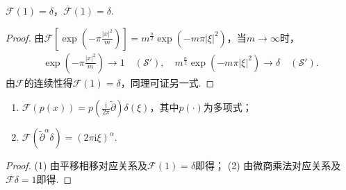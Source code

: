 \documentclass[../../main.tex]{subfiles}%
\begin{document}
\begin{proposition}
$\mathscr{F}(1)=\delta$，$\overline{\mathscr{F}}(1)=\delta$.
\end{proposition}
\begin{proof}

由$\mathscr{F}\left[\exp\left(-\pi\frac{|x|^2}{m}\right)\right]=m^{\frac{n}{2}}\exp(-m\pi|\xi|^2)$，当$m\to\infty$时，
\begin{align*}
\exp\left(-\pi\frac{|x|^2}{m}\right)\to1\quad(\mathscr{S}'),\quad m^{\frac{n}{2}}\exp(-m\pi|\xi|^2)\to\delta\quad(\mathscr{S}').
\end{align*}
由$\mathscr{F}$的连续性得$\mathscr{F}(1)=\delta$，同理可证另一式.

\end{proof}

\begin{proposition}
\begin{enumerate}[(1)]
\item $\mathscr{F}(p(x))=p\left(\frac{\mathrm{i}}{2\pi}\widetilde{\partial}\right)\delta(\xi)$，其中$p(\cdot)$为多项式；
\item $\mathscr{F}(\widetilde{\partial}^\alpha\delta)=(2\pi\mathrm{i}\xi)^\alpha$.
\end{enumerate}
\end{proposition}
\begin{proof}

(1) 由平移相移对应关系及$\mathscr{F}(1)=\delta$即得；
(2) 由微商乘法对应关系及$\mathscr{F}\delta=1$即得.

\end{proof}
\end{document}
